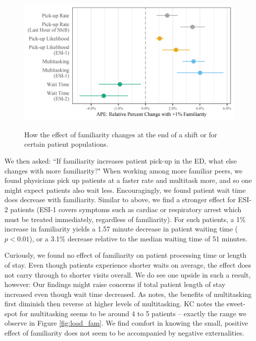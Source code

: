  \begin{figure} %
     \centering
     \caption{How the effect of familiarity changes at the end of a shift or for certain patient populations.} \smallskip
     \includegraphics[scale=1]{Figures/PU/Post Hoc - Coef Plot.png}     
     \label{fig:pu_coef_plot}
 \end{figure} 
 
 We then asked: “If familiarity increases patient pick-up in the ED, what else changes with more familiarity?" When working among more familiar peers, we found physicians pick up patients at a faster rate and multitask more, and so one might expect patients also wait less. Encouragingly, we found patient wait time does decrease with familiarity. Similar to above, we find a stronger effect for ESI-2 patients (ESI-1 covers symptoms such as cardiac or respiratory arrest which must be treated immediately, regardless of familiarity). For such patients, a 1\% increase in familiarity yields a 1.57 minute decrease in patient waiting time ($p < 0.01$), or a 3.1\% decrease relative to the median waiting time of 51 minutes.
 
 Curiously, we found no effect of familiarity on patient processing time or length of stay. Even though patients experience shorter waits on average, the effect does not carry through to shorter visits overall. We do see one upside in such a result, however: Our findings might raise concerns if total patient length of stay increased even though wait time decreased. As \cite{KC2014} notes, the benefits of multitasking first diminish then reverse at higher levels of multitasking. KC notes the sweet-spot for multitasking seems to be around 4 to 5 patients -- exactly the range we observe in Figure \ref{fig:load_fam}. We find comfort in knowing the small, positive effect of familiarity does not seem to be accompanied by negative externalities.
 
